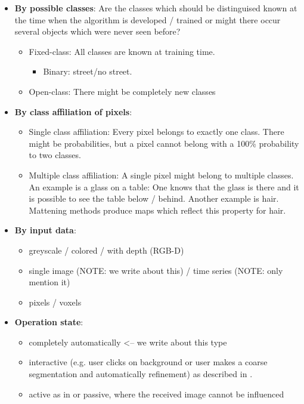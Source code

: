 \begin{itemize}
    \item \textbf{By possible classes}: Are the classes which should be distinguised
          known at the time when the algorithm is developed / trained or might
          there occur several objects which were never seen before?
          \begin{itemize}
              \item Fixed-class: All classes are known at training time.
                    \begin{itemize}
                        \item Binary: street/no street.
                    \end{itemize}
              \item Open-class: There might be completely new classes
          \end{itemize}
    \item \textbf{By class affiliation of pixels}:
          \begin{itemize}
              \item Single class affiliation: Every pixel belongs to exactly one class. There might
                    be probabilities, but a pixel cannot belong with a 100\%
                    probability to two classes.
              \item Multiple class affiliation: A single pixel might belong to
                    multiple classes. An example is a glass on a table: One
                    knows that the glass is there and it is possible to see the
                    table below / behind. Another example is hair. Mattening
                    methods produce maps which reflect this property for hair.\cite{levin2008spectral}
          \end{itemize}
    \item \textbf{By input data}:
          \begin{itemize}
              \item greyscale / colored / with depth (RGB-D)
              \item single image (NOTE: we write about this) / time series (NOTE: only mention it)
              \item pixels / voxels \cite{wolz2012multi}
          \end{itemize}
    \item \textbf{Operation state}:
          \begin{itemize}
              \item completely automatically <-- we write about this type
              \item interactive (e.g. user clicks on background or user makes a
                    coarse segmentation and automatically refinement) as
                    described in
                    \cite{protiere2007interactive,rother2004grabcut}.
              \item active as in
                    \cite{schiebener2011segmentation,schiebener2012discovery} or
                    passive, where the received image cannot be influenced
          \end{itemize}
\end{itemize}

